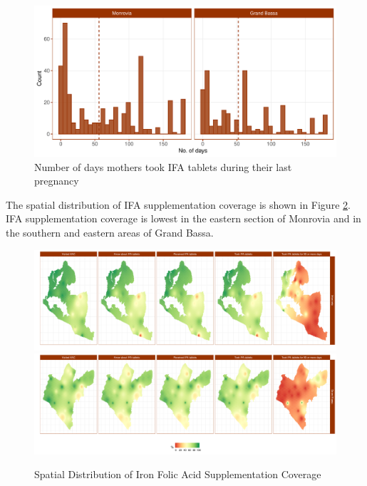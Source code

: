 \documentclass[12pt,a4paper]{article}
\begin{document}
\begin{figure}[H]

{\centering \includegraphics{liberiaCoverageReport_files/figure-latex/ifa5-1} 

}

\caption{Number of days mothers took IFA tablets during their last pregnancy}\label{fig:ifa5}
\end{figure}

The spatial distribution of IFA supplementation coverage is shown in Figure \ref{fig:ifaMap1}. IFA supplementation coverage is lowest in the eastern section of Monrovia and in the southern and eastern areas of Grand Bassa.

\begin{figure}[H]

{\centering \includegraphics{liberiaCoverageReport_files/figure-latex/ifaMap1-1} \includegraphics{liberiaCoverageReport_files/figure-latex/ifaMap1-2} 

}

\caption{Spatial Distribution of Iron Folic Acid Supplementation Coverage}\label{fig:ifaMap1}
\end{figure}
\end{document}
